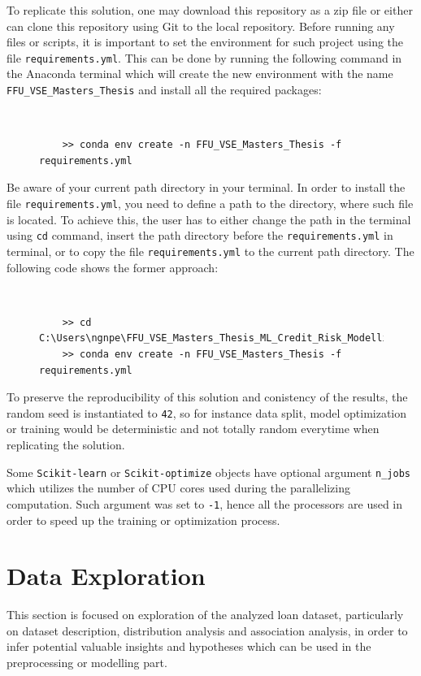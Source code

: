 To replicate this solution, one may download this repository as a zip file or either can clone this repository using Git to the local repository. Before running any files or scripts, it is important to set the environment for such project using the file \texttt{requirements.yml}. This can be done by running the following command in the Anaconda terminal which will create the new environment with the name \texttt{FFU\_VSE\_Masters\_Thesis} and install all the required packages:
\begin{figure}[H]
    \centering\
{\footnotesize
\begin{verbatim}
    >> conda env create -n FFU_VSE_Masters_Thesis -f requirements.yml    
\end{verbatim}
\vspace{-1em}
}
\end{figure}
Be aware of your current path directory in your terminal. In order to install the file \texttt{requirements.yml}, you need to define a path to the directory, where such file is located.
To achieve this, the user has to either change the path in the terminal using \texttt{cd} command, insert the path directory before the \texttt{requirements.yml} in terminal, or to copy the file \texttt{requirements.yml} to the current path directory. The following code shows the former approach:
\begin{figure}[H]
    \centering\
{\footnotesize
\begin{verbatim}
    >> cd C:\Users\ngnpe\FFU_VSE_Masters_Thesis_ML_Credit_Risk_Modelling
    >> conda env create -n FFU_VSE_Masters_Thesis -f requirements.yml   
\end{verbatim}
\vspace{-1em}
}
\end{figure}


To preserve the reproducibility of this solution and conistency of the results, the random seed is instantiated to \texttt{42}, so for instance data split, model optimization or training would be deterministic and not totally random everytime when replicating the solution.

Some \lstinline{Scikit-learn} or \lstinline{Scikit-optimize} objects have optional argument \texttt{n\_jobs} which utilizes the number of CPU cores used during the parallelizing computation. Such argument was set to \texttt{-1}, hence all the processors are used in order to  speed up the training or optimization process.


\section{Data Exploration}
This section is focused on exploration of the analyzed loan dataset, particularly on dataset description, distribution analysis and association analysis, in order to infer potential valuable insights and hypotheses which can be used in the preprocessing or modelling part.

